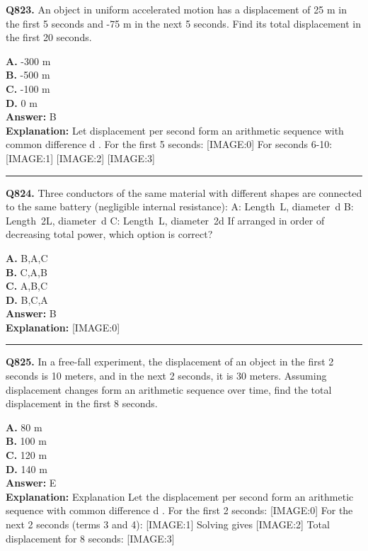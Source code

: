 \documentclass[12pt]{article}
\begin{document}
\noindent
\textbf{Q823.} An object in uniform accelerated motion has a displacement of 25 m in the first 5 seconds and -75 m in the next 5 seconds. Find its total displacement in the first 20 seconds.



\textbf{A.} -300 m \\
\textbf{B.} -500 m \\
\textbf{C.} -100 m \\
\textbf{D.} 0 m \\

\textbf{Answer:} B \\
\textbf{Explanation:} Let displacement per second form an arithmetic sequence with common difference
d
.
For the first 5 seconds:
[IMAGE:0]
For seconds 6-10:
[IMAGE:1]
[IMAGE:2]
[IMAGE:3]

\hrule
\vspace{1em}


\noindent
\textbf{Q824.} Three conductors of the same material with different shapes are connected to the same battery (negligible internal resistance):
\cdot 
A: Length L, diameter d
\cdot 
B: Length 2L, diameter d
\cdot 
C: Length L, diameter 2d
If arranged in order of
decreasing
total power, which option is correct?



\textbf{A.} B,A,C \\
\textbf{B.} C,A,B \\
\textbf{C.} A,B,C \\
\textbf{D.} B,C,A \\

\textbf{Answer:} B \\
\textbf{Explanation:} [IMAGE:0]

\hrule
\vspace{1em}


\noindent
\textbf{Q825.} In a free-fall experiment, the displacement of an object in the first 2 seconds is 10 meters, and in the next 2 seconds, it is 30 meters. Assuming displacement changes form an arithmetic sequence over time, find the total displacement in the first 8 seconds.



\textbf{A.} 80 m \\
\textbf{B.} 100 m \\
\textbf{C.} 120 m \\
\textbf{D.} 140 m \\

\textbf{Answer:} E \\
\textbf{Explanation:} Explanation
Let the displacement per second form an arithmetic sequence with common difference
d
. For the first 2 seconds:
[IMAGE:0]
For the next 2 seconds (terms 3 and 4):
[IMAGE:1]
Solving gives
[IMAGE:2]
Total displacement for 8 seconds:
[IMAGE:3]
\end{document}
